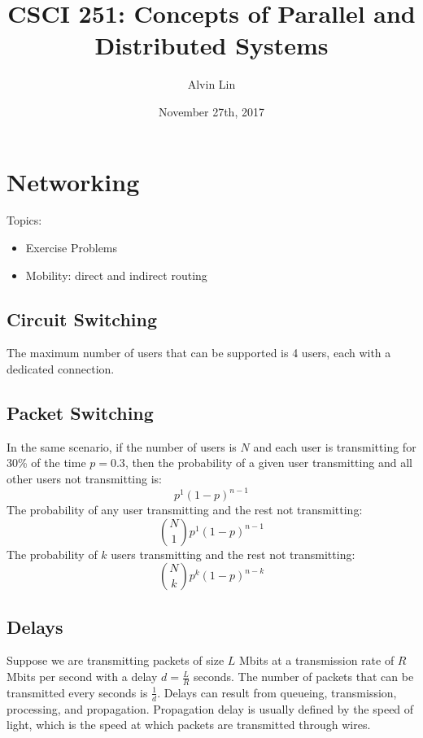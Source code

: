 \documentclass{math}
\title{CSCI 251: Concepts of Parallel and Distributed Systems}
\author{Alvin Lin}
\date{November 27th, 2017}
\begin{document}
\maketitle

\section*{Networking}
Topics:
\begin{itemize}
  \item Exercise Problems
  \item Mobility: direct and indirect routing
\end{itemize}

\subsection*{Circuit Switching}
\begin{center}
\end{center}
The maximum number of users that can be supported is 4 users, each with a
dedicated connection.

\subsection*{Packet Switching}
In the same scenario, if the number of users is \( N \) and each user is
transmitting for 30\% of the time \( p = 0.3 \), then the probability of a
given user transmitting and all other users not transmitting is:
\[ p^1(1-p)^{n-1} \]
The probability of any user transmitting and the rest not transmitting:
\[ \binom{N}{1}p^1(1-p)^{n-1} \]
The probability of \( k \) users transmitting and the rest not transmitting:
\[ \binom{N}{k}p^k(1-p)^{n-k} \]

\subsection*{Delays}
Suppose we are transmitting packets of size \( L \) Mbits at a transmission rate
of \( R \) Mbits per second with a delay \( d = \frac{L}{R} \) seconds. The
number of packets that can be transmitted every seconds is \( \frac{1}{d} \).
Delays can result from queueing, transmission, processing, and propagation.
Propagation delay is usually defined by the speed of light, which is the speed
at which packets are transmitted through wires.
\end{document}
